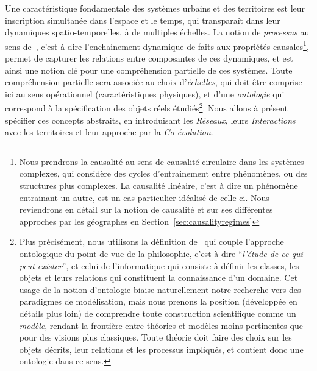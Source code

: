 {Une caractéristique fondamentale des systèmes urbains et des territoires est leur inscription simultanée dans l'espace et le temps, qui transparaît dans leur dynamiques spatio-temporelles, à de multiples échelles. La notion de \emph{processus} au sens de~\cite{hypergeo}, c'est à dire l'enchainement dynamique de faits aux propriétés causales\footnote{Nous prendrons la causalité au sens de causalité circulaire dans les systèmes complexes, qui considère des cycles d'entrainement entre phénomènes, ou des structures plus complexes. La causalité linéaire, c'est à dire un phénomène entrainant un autre, est un cas particulier idéalisé de celle-ci. Nous reviendrons en détail sur la notion de causalité et sur ses différentes approches par les géographes en Section~\ref{sec:causalityregimes}}, permet de capturer les relations entre composantes de ces dynamiques, et est ainsi une notion clé pour une compréhension partielle de ces systèmes. Toute compréhension partielle sera associée au choix d'\emph{échelles}, qui doit être comprise ici au sens opérationnel (caractéristiques physiques), et d'une \emph{ontologie} qui correspond à la spécification des objets réels étudiés\footnote{Plus précisément, nous utilisons la définition de~\cite{livet2010} qui couple l'approche ontologique du point de vue de la philosophie, c'est à dire ``\textit{l'étude de ce qui peut exister}'', et celui de l'informatique qui consiste à définir les classes, les objets et leurs relations qui constituent la connaissance d'un domaine. Cet usage de la notion d'ontologie biaise naturellement notre recherche vers des paradigmes de modélisation, mais nous prenons la position (développée en détails plus loin) de comprendre toute construction scientifique comme un \emph{modèle}, rendant la frontière entre théories et modèles moins pertinentes que pour des visions plus classiques. Toute théorie doit faire des choix sur les objets décrits, leur relations et les processus impliqués, et contient donc une ontologie dans ce sens.}. Nous allons à présent spécifier ces concepts abstraits, en introduisant les \emph{Réseaux}, leurs \emph{Interactions} avec les territoires et leur approche par la \emph{Co-évolution}.
}

